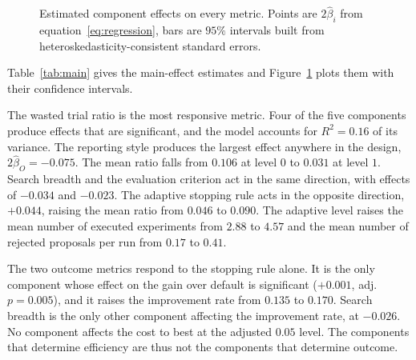 \documentclass[11pt]{article}
\begin{document}
\begin{figure}[t]
\caption{Estimated component effects on every metric. Points are $2\hat\beta_i$ from
equation~\eqref{eq:regression}, bars are $95\%$ intervals built from
heteroskedasticity-consistent standard errors.}
\label{fig:coefficients}
\end{figure}

Table~\ref{tab:main} gives the main-effect estimates and Figure~\ref{fig:coefficients} plots them with their confidence intervals. 

The wasted trial ratio is the most responsive metric. Four of the five components produce effects that are significant, and the model accounts for $R^2=0.16$ of its variance. The reporting style produces the largest effect anywhere in the design, $2\hat\beta_O=-0.075$. The mean ratio falls from $0.106$ at level $0$ to $0.031$ at level $1$. Search breadth and the evaluation criterion act in the same direction, with effects of $-0.034$ and $-0.023$. The adaptive stopping rule acts in the opposite direction, $+0.044$, raising the mean ratio from $0.046$ to $0.090$. The adaptive level raises the mean number of executed experiments from $2.88$ to $4.57$ and the mean number of rejected proposals per run from $0.17$ to $0.41$. 

The two outcome metrics respond to the stopping rule alone. It is the only component whose effect on the gain over default is significant ($+0.001$, adj.\ $p=0.005$), and it raises the improvement rate from $0.135$ to $0.170$. Search breadth is the only other component affecting the improvement rate, at $-0.026$. No component affects the cost to best at the adjusted $0.05$ level. The components that determine efficiency are thus not the components that determine outcome.
\end{document}
